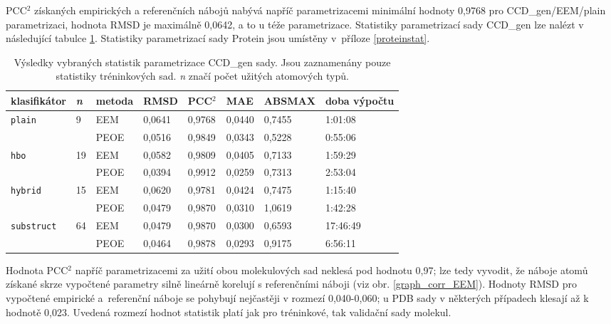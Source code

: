 PCC$^2$ získaných empirických a referenčních nábojů nabývá napříč parametrizacemi minimální hodnoty 0,9768 pro CCD\_gen/EEM/plain parametrizaci, hodnota RMSD je maximálně 0,0642, a to u téže parametrizace. Statistiky parametrizací sady CCD\_gen lze nalézt v následující tabulce \ref{statistics}. Statistiky parametrizací sady Protein jsou umístěny v~příloze \ref{proteinstat}. 
\medskip
\begin{table}[h]
    \small
    \renewcommand{\arraystretch}{1.4}
    \centering
    \begin{tabular}{l|l|l|l|l|l|l|l}
         \textbf{klasifikátor} & \textbf{\textit{n}} & \textbf{metoda} & \textbf{RMSD} & \textbf{PCC$^2$} & \textbf{MAE} & \textbf{ABSMAX} & \textbf{doba výpočtu}\\
         \hline
         \multirow{2}{6em}{\texttt{plain}} & \multirow{2}{1.5em}{ 9} & EEM & 0,0641 & 0,9768 & 0,0440 & 0,7455 & 1:01:08 \\
         & & PEOE & 0,0516 & 0,9849 & 0,0343 & 0,5228 & 0:55:06 \\
         \hline
         \multirow{2}{6em}{\texttt{hbo}} & \multirow{2}{1.5em}{19} & EEM & 0,0582 & 0,9809 & 0,0405 & 0,7133 & 1:59:29  \\
         & & PEOE & 0,0394 & 0,9912 & 0,0259 & 0,7313 & 2:53:04 \\
         \hline
         \multirow{2}{6em}{\texttt{hybrid}} & \multirow{2}{1.5em}{15} & EEM & 0,0620 & 0,9781 & 0,0424 & 0,7475 & 1:15:40 \\
         & & PEOE & 0,0479 & 0,9870 & 0,0310 & 1,0619 & 1:42:28 \\
         \hline
         \multirow{2}{6em}{\texttt{substruct}} & \multirow{2}{1.5em}{64} & EEM & 0,0479 & 0,9870 & 0,0300 & 0,6593 & 17:46:49 \\
         & & PEOE & 0,0464 & 0,9878 & 0,0293 & 0,9175 & 6:56:11 
    \end{tabular}
    \caption{Výsledky vybraných statistik parametrizace CCD\_gen sady. Jsou zaznamenány pouze statistiky tréninkových sad. \textit{n} značí počet užitých atomových typů.}
    \label{statistics}
\end{table}
\medskip

Hodnota PCC$^2$ napříč parametrizacemi za užití obou molekulových sad neklesá pod hodnotu 0,97; lze tedy vyvodit, že náboje atomů získané skrze vypočtené parametry silně lineárně korelují s referenčními náboji (viz obr. \ref{graph_corr_EEM}). Hodnoty RMSD pro vypočtené empirické a~referenční náboje se pohybují nejčastěji v rozmezí 0,040-0,060; u PDB sady v některých případech klesají až k hodnotě 0,023. Uvedená rozmezí hodnot statistik platí jak pro tréninkové, tak validační sady molekul. 

